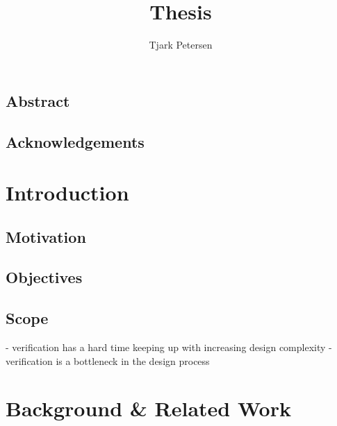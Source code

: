 \documentclass[11pt]{book}
\author{Tjark Petersen}
\title{Thesis}
\begin{document}
\maketitle

\section*{Abstract} %

\section*{Acknowledgements} %

\newpage

\tableofcontents


\chapter{Introduction} %

\section{Motivation} %

\section{Objectives} %

\section{Scope} %

- verification has a hard time keeping up with increasing design complexity
- verification is a bottleneck in the design process

\chapter{Background \& Related Work} %
\end{document}
